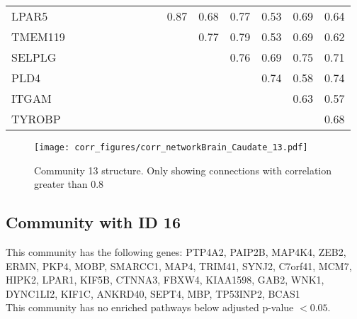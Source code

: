 \begin{longtable}{lrrrrrrrrrrrrrr}
LPAR5   &              &              &              &              &             &             &           &             &          0.87 &         0.68 &       0.77 &        0.53 &         0.69 &         0.64 \\
TMEM119 &              &              &              &              &             &             &           &             &               &         0.77 &       0.79 &        0.53 &         0.69 &         0.62 \\
SELPLG  &              &              &              &              &             &             &           &             &               &              &       0.76 &        0.69 &         0.75 &         0.71 \\
PLD4    &              &              &              &              &             &             &           &             &               &              &            &        0.74 &         0.58 &         0.74 \\
ITGAM   &              &              &              &              &             &             &           &             &               &              &            &             &         0.63 &         0.57 \\
TYROBP  &              &              &              &              &             &             &           &             &               &              &            &             &              &         0.68 \\
\end{longtable}


\begin{figure}[h!]
\centering
\texttt{[image: corr\_figures/corr\_networkBrain\_Caudate\_13.pdf]}
\caption{Community 13 structure. Only showing connections with correlation greater than 0.8}
\end{figure}




\subsection*{Community with ID 16}
This community has the following genes: PTP4A2, PAIP2B, MAP4K4, ZEB2, ERMN, PKP4, MOBP, SMARCC1, MAP4, TRIM41, SYNJ2, C7orf41, MCM7, HIPK2, LPAR1, KIF5B, CTNNA3, FBXW4, KIAA1598, GAB2, WNK1, DYNC1LI2, KIF1C, ANKRD40, SEPT4, MBP, TP53INP2, BCAS1
\\
This community has no enriched pathways below adjusted p-value $< 0.05$.

